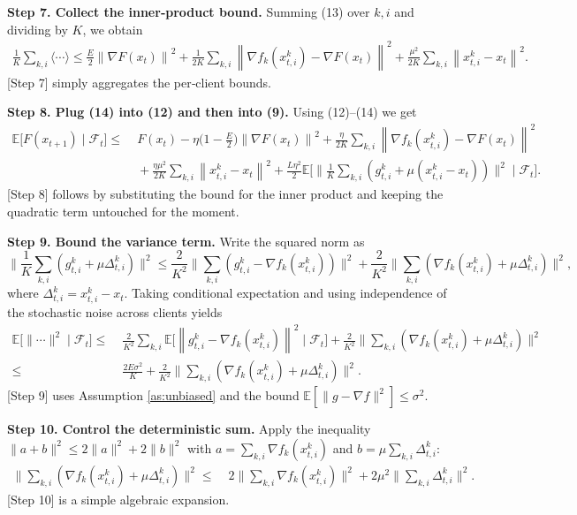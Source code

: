 \documentclass{article}
\newcommand{\EE}{\mathbb{E}}
\newcommand{\norm}[1]{\left\|#1\right\|}
\begin{document}
\noindent\textbf{Step 7.  Collect the inner‑product bound.}  
Summing (13) over $k,i$ and dividing by $K$, we obtain
\begin{align}
\frac1K\sum_{k,i}\Big\langle\cdots\Big\rangle
\le \frac{E}{2}\norm{\nabla F(x_t)}^{2}
   +\frac{1}{2K}\sum_{k,i}\norm{\nabla f_k(x_{t,i}^{k})-\nabla F(x_t)}^{2}
   +\frac{\mu^{2}}{2K}\sum_{k,i}\norm{x_{t,i}^{k}-x_t}^{2}.   \tag{14}
\end{align}
[Step 7] simply aggregates the per‑client bounds.

\noindent\textbf{Step 8.  Plug (14) into (12) and then into (9).}  
Using (12)–(14) we get
\begin{align}
\EE\!\big[F(x_{t+1})\mid\mathcal{F}_t\big]
\le&\;F(x_t)-\eta\Big(1-\frac{E}{2}\Big)\norm{\nabla F(x_t)}^{2}
   +\frac{\eta}{2K}\sum_{k,i}\norm{\nabla f_k(x_{t,i}^{k})-\nabla F(x_t)}^{2} \nonumber\\
&\;+\frac{\eta\mu^{2}}{2K}\sum_{k,i}\norm{x_{t,i}^{k}-x_t}^{2}
   +\frac{L\eta^{2}}{2}\EE\!\Big[\big\|\frac1K\sum_{k,i}
   (g_{t,i}^{k}+\mu(x_{t,i}^{k}-x_t))\big\|^{2}\mid\mathcal{F}_t\Big]. \tag{15}
\end{align}
[Step 8] follows by substituting the bound for the inner product and
keeping the quadratic term untouched for the moment.

\noindent\textbf{Step 9.  Bound the variance term.}  
Write the squared norm as
\[
\Big\|\frac1K\sum_{k,i}(g_{t,i}^{k}+\mu\Delta_{t,i}^{k})\Big\|^{2}
\le
\frac{2}{K^{2}}\Big\|\sum_{k,i}(g_{t,i}^{k}-\nabla f_k(x_{t,i}^{k}))\Big\|^{2}
   +\frac{2}{K^{2}}\Big\|\sum_{k,i}(\nabla f_k(x_{t,i}^{k})+\mu\Delta_{t,i}^{k})\Big\|^{2},
\tag{16}
\]
where $\Delta_{t,i}^{k}=x_{t,i}^{k}-x_t$.
Taking conditional expectation and using independence of the stochastic
noise across clients yields
\begin{align}
\EE\!\Big[\big\|\cdots\big\|^{2}\mid\mathcal{F}_t\Big]
\le&\; \frac{2}{K^{2}}\sum_{k,i}\EE\!\big[\norm{g_{t,i}^{k}-\nabla f_k(x_{t,i}^{k})}^{2}\mid\mathcal{F}_t\big]
      +\frac{2}{K^{2}}\Big\|\sum_{k,i}
        (\nabla f_k(x_{t,i}^{k})+\mu\Delta_{t,i}^{k})\Big\|^{2} \nonumber\\
\le&\; \frac{2E\sigma^{2}}{K}   %
      +\frac{2}{K^{2}}\Big\|\sum_{k,i}
        (\nabla f_k(x_{t,i}^{k})+\mu\Delta_{t,i}^{k})\Big\|^{2}.        \tag{17}
\end{align}
[Step 9] uses Assumption \ref{as:unbiased} and the bound $\EE[\|g-\nabla f\|^{2}]\le\sigma^{2}$.

\noindent\textbf{Step 10.  Control the deterministic sum.}  
Apply the inequality $\|a+b\|^{2}\le2\|a\|^{2}+2\|b\|^{2}$ with
$a=\sum_{k,i}\nabla f_k(x_{t,i}^{k})$ and $b=\mu\sum_{k,i}\Delta_{t,i}^{k}$:
\begin{align}
\Big\|\sum_{k,i}(\nabla f_k(x_{t,i}^{k})+\mu\Delta_{t,i}^{k})\Big\|^{2}
\le&\;2\Big\|\sum_{k,i}\nabla f_k(x_{t,i}^{k})\Big\|^{2}
   +2\mu^{2}\Big\|\sum_{k,i}\Delta_{t,i}^{k}\Big\|^{2}.          \tag{18}
\end{align}
[Step 10] is a simple algebraic expansion.
\end{document}
